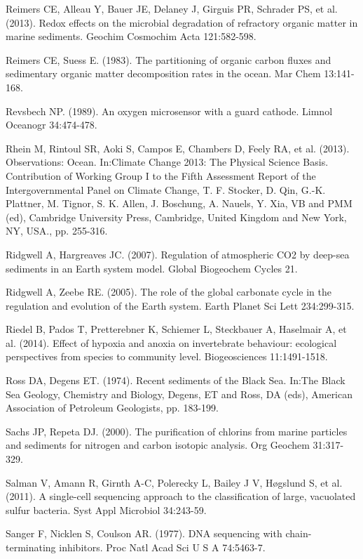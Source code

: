 Reimers CE, Alleau Y, Bauer JE, Delaney J, Girguis PR, Schrader PS, et al. (2013). Redox effects on the microbial degradation of refractory organic matter in marine sediments. Geochim Cosmochim Acta 121:582-598.

Reimers CE, Suess E. (1983). The partitioning of organic carbon fluxes and sedimentary organic matter decomposition rates in the ocean. Mar Chem 13:141-168.

Revsbech NP. (1989). An oxygen microsensor with a guard cathode. Limnol Oceanogr 34:474-478.

Rhein M, Rintoul SR, Aoki S, Campos E, Chambers D, Feely RA, et al. (2013). Observations: Ocean. In:Climate Change 2013: The Physical Science Basis. Contribution of Working Group I to the Fifth Assessment Report of the Intergovernmental Panel on Climate Change, T. F. Stocker, D. Qin, G.-K. Plattner, M. Tignor, S. K. Allen, J. Boschung, A. Nauels, Y. Xia, VB and PMM (ed), Cambridge University Press, Cambridge, United Kingdom and New York, NY, USA., pp. 255-316.

Ridgwell A, Hargreaves JC. (2007). Regulation of atmospheric CO2 by deep-sea sediments in an Earth system model. Global Biogeochem Cycles 21.

Ridgwell A, Zeebe RE. (2005). The role of the global carbonate cycle in the regulation and evolution of the Earth system. Earth Planet Sci Lett 234:299-315.

Riedel B, Pados T, Pretterebner K, Schiemer L, Steckbauer A, Haselmair A, et al. (2014). Effect of hypoxia and anoxia on invertebrate behaviour: ecological perspectives from species to community level. Biogeosciences 11:1491-1518.

Ross DA, Degens ET. (1974). Recent sediments of the Black Sea. In:The Black Sea Geology, Chemistry and Biology, Degens, ET and Ross, DA (eds), American Association of Petroleum Geologists, pp. 183-199.

Sachs JP, Repeta DJ. (2000). The purification of chlorins from marine particles and sediments for nitrogen and carbon isotopic analysis. Org Geochem 31:317-329.

Salman V, Amann R, Girnth A-C, Polerecky L, Bailey J V, H{\o}gslund S, et al. (2011). A single-cell sequencing approach to the classification of large, vacuolated sulfur bacteria. Syst Appl Microbiol 34:243-59.

Sanger F, Nicklen S, Coulson AR. (1977). DNA sequencing with chain-terminating inhibitors. Proc Natl Acad Sci U S A 74:5463-7.

